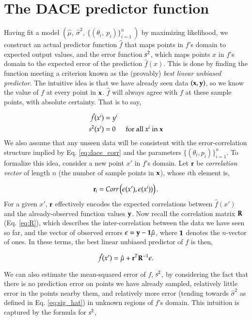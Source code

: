 \section{The DACE predictor function}
Having fit a model $(\hat{\mu},\ \hat{\sigma}^2,\ \{(\theta_i,\ p_i)\}_{i=1}^n\ )$ by maximizing likelihood, we construct an actual predictor function $\hat{f}$ that maps points in $f$'s domain to expected output values, and the error function $s^2$, which maps points $x$ in $f$'s domain to the expected error of the prediction $\hat{f}(x)$. This is done by finding the function meeting a criterion known as the (provably) \emph{best linear unbiased predictor}. The intuitive idea is that we have already seen data $(\mathbf{x},\mathbf{y})$, so we know the value of $f$ at every point in $\mathbf{x}$. $\hat{f}$ will always agree with $f$ at these sample points, with absolute certainty. That is to say,

\begin{align}
\hat{f}(x^i)&=y^i\\
s^2(x^i)&=0\ \ \ \ \ \mbox{ for all $x^i$ in $\mathbf{x}$}
\end{align}
We also assume that any unseen data will be consistent with the error-correlation structure implied by Eq. \ref{eq:dace_corr} and the parameters $\{(\theta_i,p_i)\}_{i=1}^n$. To formalize this idea, consider a new point $x'$ in $f$'s domain. Let $\mathbf{r}$ be \emph{correlation vector} of length $n$ (the number of sample points in $\mathbf{x}$), whose $i$th element is,

\begin{equation}\label{eq:r}
\mathbf{r}_i = Corr\left( \epsilon(x'),\epsilon(x^i))\right).
\end{equation}
For a given $x'$, $\mathbf{r}$ effectively encodes the expected correlations between $\hat{f}(x')$ and the already-observed function values $\mathbf{y}$. Now recall the correlation matrix $\mathbf{R}$ (Eq. \ref{eq:R}), which describes the inter-correlation between the data we have seen so far, and the vector of observed errors $\mathbf{\epsilon} = \mathbf{y} - \mathbf{1}\hat{\mu}$, where $\mathbf{1}$ denotes the $n$-vector of ones. In these terms, the best linear unbiased predictor of $f$ is then,

\begin{equation}\label{eq:blup}
\hat{f}(x')=\hat{\mu} + \mathbf{r}^T\mathbf{R}^{-1}\mathbf{\epsilon}.
\end{equation}

We can also estimate the mean-squared error of $f$, $s^2$, by considering the fact that there is no prediction error on points we have already sampled, relatively little error in the points nearby them, and relatively more error (tending towards $\hat{\sigma}^2$ as defined in Eq. \ref{eq:sig_hat}) in unknown regions of $f$'s domain. This intuition is captured by the formula for $s^2$,

